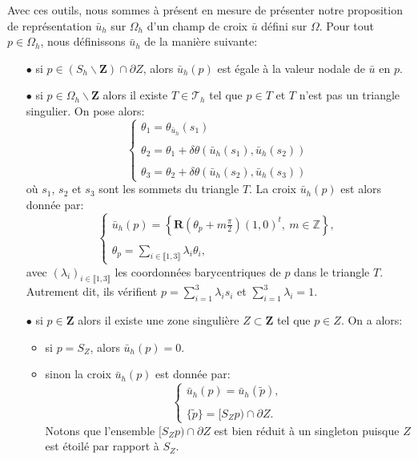 Avec ces outils, nous sommes à présent en mesure de présenter notre proposition de représentation $\bar{u}_h$ sur $\Omega_h$ d'un champ de croix $\bar{u}$ défini sur $\Omega$. Pour tout $p\in\Omega_h$, nous définissons $\bar{u}_h$ de la manière suivante:\\

\begin{itemize}
\item[$\bullet$] si $p\in(S_h\backslash\mathbf{Z})\cap\partial Z$, alors $\bar{u}_h(p)$ est égale à la valeur nodale de $\bar{u}$ en $p$.\\%
\item[$\bullet$] si $p\in\Omega_h\backslash\mathbf{Z}$ alors il existe $T\in\mathcal{T}_h$ tel que $p\in T$ et $T$ n'est pas un triangle singulier. On pose alors:
$$
\left\{
\begin{array}{l}
\theta_1 = \theta_{\bar{u}_h}(s_1)\\\\
\theta_2 = \theta_1 + \delta\theta(\bar{u}_h(s_1),\bar{u}_h(s_2))\\\\
\theta_3 = \theta_2 + \delta\theta(\bar{u}_h(s_2),\bar{u}_h(s_3))
\end{array}
\right.
$$
où $s_1$, $s_2$ et $s_3$ sont les sommets du triangle $T$. La croix $\bar{u}_h(p)$ est alors donnée par:
$$
\left\{
\begin{array}{l}
\bar{u}_h(p)=\displaystyle\left\{\mathbf{R}\left(\theta_p+m\frac{\pi}{2}\right)(1,0)^t,~m\in\mathbb{Z}\right\},\\\\
\theta_p=\displaystyle\sum_{i\in\llbracket1, 3\rrbracket}\lambda_i\theta_i,
\end{array}
\right.
$$
avec $(\lambda_i)_{i\in\llbracket 1, 3\rrbracket}$ les coordonnées barycentriques de $p$ dans le triangle $T$. Autrement dit, ils vérifient $p=\sum_{i=1}^3\lambda_i s_i$ et $\sum_{i=1}^3\lambda_i=1$.\\
\item[$\bullet$] si $p\in\mathbf{Z}$ alors il existe une zone singulière $Z\subset\mathbf{Z}$ tel que $p\in Z$. On a alors:\\
\begin{itemize}
 \item si $p=S_Z$, alors $\bar{u}_h(p)=0$.\\
 \item sinon la croix $\bar{u}_h(p)$ est donnée par:
\begin{equation}
\label{eqn:etoilage}
\left\{
\begin{array}{l}
\bar{u}_h(p)=\bar{u}_h(\widetilde{p}),\\\\
\{\widetilde{p}\}=[S_Zp)\cap\partial Z.
\end{array}
\right.
\end{equation}
Notons que l'ensemble $[S_Zp)\cap\partial Z$ est bien réduit à un singleton puisque $Z$ est étoilé par rapport à $S_Z$.\\
\end{itemize}
\end{itemize}

